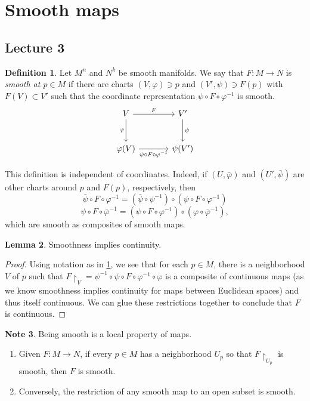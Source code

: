 \documentclass[10pt,letterpaper,cm]{nupset}
\theoremstyle{definition}
\newtheorem{definition}{Definition}[subsection]
\newtheorem{note}[definition]{Note}
\theoremstyle{theorem}
\newtheorem{lemma}[definition]{Lemma}
\theoremstyle{remark}
\newcommand{\1}{\mathbf{1}}
\newcommand{\0}{\vec 0}
\begin{document}
\section{Smooth maps}

\subsection{Lecture 3}

\begin{definition}\label{smap}
Let $M^n$ and $N^k$ be smooth manifolds. We say that $F: M \to N$ is \textit{smooth at $p \in M$} if there are charts $\left(V, \varphi\right) \ni p$ and $\left(V', \psi\right) \ni F(p)$ with $F(V) \subset V'$ such that the coordinate representation $\psi \circ F \circ \varphi^{-1}$ is smooth.
\[
\begin{tikzcd}[row sep=large, column sep = large]
V \arrow[r, "F"] \arrow[d, "\varphi", swap]
& V' \arrow[d, "\psi"] \\
\varphi(V) \arrow[r, "\psi \circ F \circ \varphi^{-1}"']
& \psi(V')
\end{tikzcd}
\]
\end{definition}

This definition is independent of coordinates. Indeed, if $\left(U, \bar{\varphi}\right)$ and $\left(U', \bar{\psi}\right)$ are other charts around $p$ and $F(p)$, respectively, then $$\bar{\psi} \circ F \circ \varphi^{-1} = (\bar{\psi} \circ \psi^{-1}) \circ (\psi \circ F \circ \varphi^{-1})$$ $$\psi \circ F\circ \bar{\varphi}^{-1} = (\psi \circ F \circ \varphi^{-1}) \circ (\varphi \circ \bar{\varphi}^{-1}),$$ which are smooth as composites of smooth maps.

\begin{lemma}\label{sco}
Smoothness implies continuity.
\end{lemma}
\begin{proof}
Using notation as in \cref{smap}, we see that for each $p\in M$, there is a neighborhood $V$ of $p$ such that $F\restriction_V =  \psi^{-1} \circ \psi \circ F \circ \varphi^{-1} \circ \varphi$ is a composite of continuous maps (as we know smoothness implies continuity for maps between Euclidean spaces) and thus itself continuous. We can glue these restrictions together to conclude that $F$ is continuous. 
\end{proof}


\begin{note} Being smooth is a local property of maps.
\begin{enumerate}
\item Given $F:M\to N$, if every $p\in M$ has a neighborhood $U_p$ so that $F\restriction_{U_p}$ is smooth, then $F$ is smooth.
\item Conversely, the restriction of any smooth map to an open subset is smooth. 
\end{enumerate}
\end{note}
\end{document}
